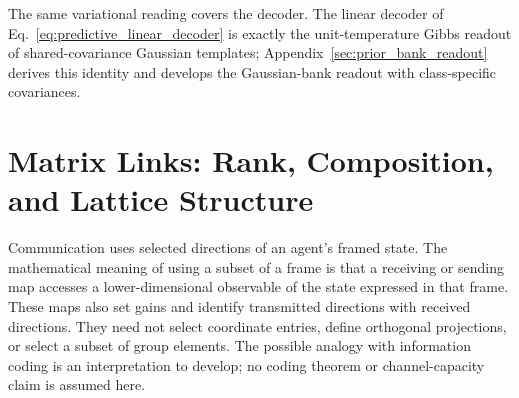 \documentclass[twoside,11pt]{article}
\begin{document}
The same variational reading covers the decoder. The linear decoder of Eq.~\eqref{eq:predictive_linear_decoder} is exactly the unit-temperature Gibbs readout of shared-covariance Gaussian templates; Appendix~\ref{sec:prior_bank_readout} derives this identity and develops the Gaussian-bank readout with class-specific covariances.

\section{Matrix Links: Rank, Composition, and Lattice Structure}
\label{sec:matrix_link_fields}
\label{sec:projection_link_geometry}

Communication uses selected directions of an agent's framed state. The mathematical meaning of using a subset of a frame is that a receiving or sending map accesses a lower-dimensional observable of the state expressed in that frame. These maps also set gains and identify transmitted directions with received directions. They need not select coordinate entries, define orthogonal projections, or select a subset of group elements. The possible analogy with information coding is an interpretation to develop; no coding theorem or channel-capacity claim is assumed here.
\end{document}
